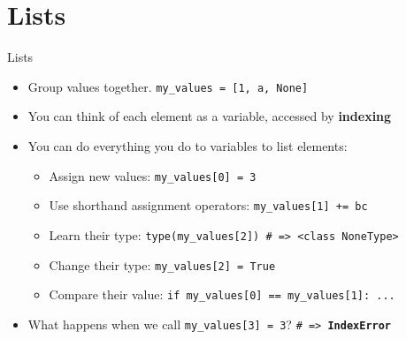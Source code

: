     \section{Lists}
        \begin{frame}{Lists}
            \begin{itemize}
                \LARGE
                \item Group values together.
                \pause 
                 \texttt{my\_values = [1, \textquotesingle a\textquotesingle, None]}
                \pause
                \item You can think of each element as a variable, accessed by \textbf{indexing}
                \pause
                \item You can do everything you do to variables to list elements:
                \pause
                    \begin{itemize}
                        \Large
                        \item Assign new values: \texttt{my\_values[0] = 3}
                        \pause
                        \item Use shorthand assignment operators: \texttt{my\_values[1] += \textquotesingle bc\textquotesingle}
                        \pause
                        \item Learn their type: \texttt{type(my\_values[2]) \# => <class \textquotesingle NoneType\textquotesingle>}
                        \pause
                        \item Change their type: \texttt{my\_values[2] = True}
                        \pause
                        \item Compare their value: \texttt{if my\_values[0] == my\_values[1]: ...}
                    \end{itemize}
                \pause
                \item What happens when we call \texttt{my\_values[3] = 3}?
                \pause
                 \texttt{\# => \textbf{IndexError}}
            \end{itemize}
        \end{frame}

